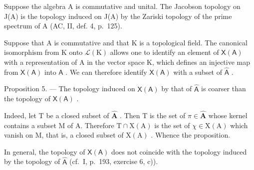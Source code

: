 Suppose the algebra A is commutative and unital. The Jacobson topology on J(A) is the topology induced on J(A) by the Zariski topology of the prime spectrum of A (AC, II, def. 4, p.~125).

Suppose that A is commutative and that K is a topological field. The canonical isomorphism from K onto \(\mathcal{L}(\mathrm{K})\) allows one to identify an element of \(\mathsf{X}(\mathsf{A})\) with a representation of A in the vector space K, which defines an injective map from \(\mathsf{X}(\mathsf{A})\) into \(\widehat{\mathsf{A}}\) . We can therefore identify \(\mathsf{X}(\mathsf{A})\) with a subset of \(\widehat{\mathsf{A}}\) .

Proposition 5. — The topology induced on \(\mathsf{X}(\mathsf{A})\) by that of \(\widehat{\mathsf{A}}\) is coarser than the topology of \(\mathsf{X}(\mathsf{A})\) .

Indeed, let T be a closed subset of \(\widehat{\mathbf{A}}\) . Then T is the set of \(\pi \in \widehat{\mathbf{A}}\) whose kernel contains a subset M of A. Therefore \(\mathrm{T} \cap \mathrm{X}(\mathrm{A})\) is the set of \(\chi \in \mathrm{X}(\mathrm{A})\) which vanish on M, that is, a closed subset of \(\mathrm{X}(\mathrm{A})\) . Whence the proposition.

In general, the topology of \(\mathsf{X}(\mathsf{A})\) does not coincide with the topology induced by the topology of \(\widehat{\mathsf{A}}\) (cf.~I, p.~193, exercise 6, c)).

